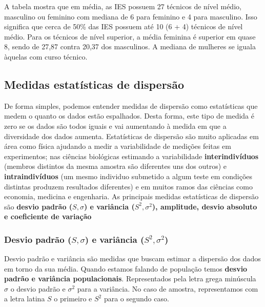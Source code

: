 \documentclass[11pt,]{style/krantz}
\theoremstyle{definition}
\theoremstyle{definition}
\theoremstyle{definition}
\theoremstyle{remark}
\begin{document}
A tabela mostra que em média, as IES possuem 27 técnicos de nível médio, masculino ou feminino com mediana de 6 para feminino e 4 para masculino. Isso significa que cerca de 50\% das IES possuem até 10 (6 + 4) técnicos de nível médio.
Para os técnicos de nível superior, a média feminina é superior em quase 8, sendo de 27,87 contra 20,37 dos masculinos. A mediana de mulheres se iguala àquelas com curso técnico.

\hypertarget{medidas-estatisticas-de-dispersao}{%
\subsection{Medidas estatísticas de dispersão}\label{medidas-estatisticas-de-dispersao}}

De forma simples, podemos entender medidas de dispersão como estatísticas que medem o quanto os dados estão espalhados. Desta forma, este tipo de medida é zero se os dados são todos iguais e vai aumentando à medida em que a diversidade dos dados aumenta.
Estatísticas de dispersão são muito aplicadas em área como física ajudando a medir a variabilidade de medições feitas em experimentos; nas ciências biológicas estimando a variabilidade \textbf{interindivíduos} (membros distintos da mesma amostra são diferentes uns dos outros) e \textbf{intraindivíduos} (um mesmo individuo submetido a algum teste em condições distintas produzem resultados diferentes) e em muitos ramos das ciências como economia, medicina e engenharia.
As principais medidas estatísticas de dispersão são \textbf{desvio padrão (\(S,\sigma\)) e variância (\(S^2,\sigma^2\)), amplitude, desvio absoluto e coeficiente de variação}

\hypertarget{desvio-padrao-ssigma-e-variancia-s2sigma2}{%
\subsubsection{\texorpdfstring{Desvio padrão (\(S,\sigma\)) e variância (\(S^2,\sigma^2\))}{Desvio padrão (S,\textbackslash{}sigma) e variância (S\^{}2,\textbackslash{}sigma\^{}2)}}\label{desvio-padrao-ssigma-e-variancia-s2sigma2}}

Desvio padrão e variância são medidas que buscam estimar a dispersão dos dados em torno da sua média. Quando estamos falando de população temos \textbf{desvio padrão e variância populacionais}. Representados pela letra grega minúscula \(\sigma\) o desvio padrão e \(\sigma^2\) para a variância. No caso de amostra, representamos com a letra latina \(S\) o primeiro e \(S^2\) para o segundo caso.
\end{document}
